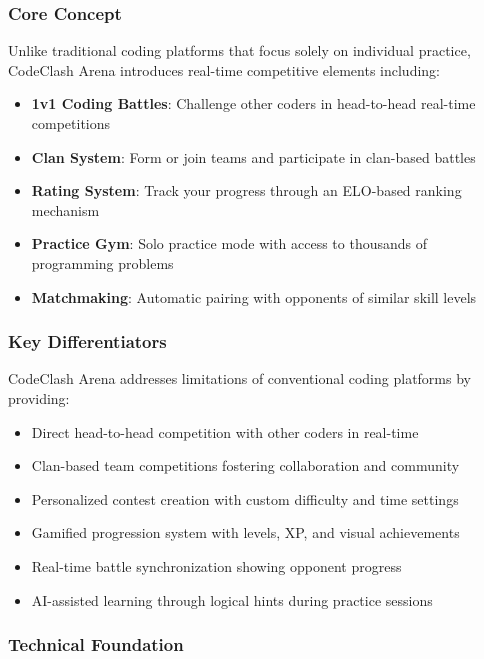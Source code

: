 \documentclass[12pt]{article}
\begin{document}
\subsubsection{Core Concept}

Unlike traditional coding platforms that focus solely on individual practice, CodeClash Arena introduces real-time competitive elements including:
\begin{itemize}
\item \textbf{1v1 Coding Battles}: Challenge other coders in head-to-head real-time competitions
\item \textbf{Clan System}: Form or join teams and participate in clan-based battles
\item \textbf{Rating System}: Track your progress through an ELO-based ranking mechanism
\item \textbf{Practice Gym}: Solo practice mode with access to thousands of programming problems
\item \textbf{Matchmaking}: Automatic pairing with opponents of similar skill levels
\end{itemize}

\clearpage
\subsubsection{Key Differentiators}

CodeClash Arena addresses limitations of conventional coding platforms by providing:
\begin{itemize}
\item Direct head-to-head competition with other coders in real-time
\item Clan-based team competitions fostering collaboration and community
\item Personalized contest creation with custom difficulty and time settings
\item Gamified progression system with levels, XP, and visual achievements
\item Real-time battle synchronization showing opponent progress
\item AI-assisted learning through logical hints during practice sessions
\end{itemize}

\subsubsection{Technical Foundation}
\end{document}
